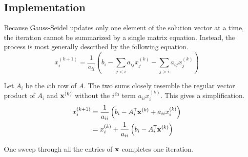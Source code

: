 \subsection*{Implementation} %


Because Gauss-Seidel updates only one element of the solution vector at a time, the iteration cannot be summarized by a single matrix equation.
Instead, the process is most generally described by the following equation.
\begin{equation} \label{eq:gauss-seidel-full}
x^{(k+1)}_i = \frac{1}{a_{ii}} \left (b_i - \sum_{j < i}a_{ij}x^{(k)}_j - \sum_{j > i}a_{ij}x^{(k)}_j \right )
\end{equation}

Let $A_i$ be the $i$th row of $A$.
The two sums closely resemble the regular vector product of $A_i$ and $\mathbf{x}^{(k)}$ without the $i^{\text{th}}$ term $a_{ii}x^{(k)}_i$.
This gives a simplification.
\begin{align}
\nonumber x^{(k+1)}_i &= \frac{1}{a_{ii}} \left(b_i - A_i^{\mathsf T}\mathbf{x}^{(k)} + a_{ii}x^{(k)}_i \right)\\
&= x^{(k)}_i + \frac{1}{a_{ii}}\left( b_i - A_i^{\mathsf T}\mathbf{x}^{(k)}\right)
\label{eq:gauss_seidel}
\end{align}

One sweep through all the entries of $\mathbf{x}$ completes one iteration.


